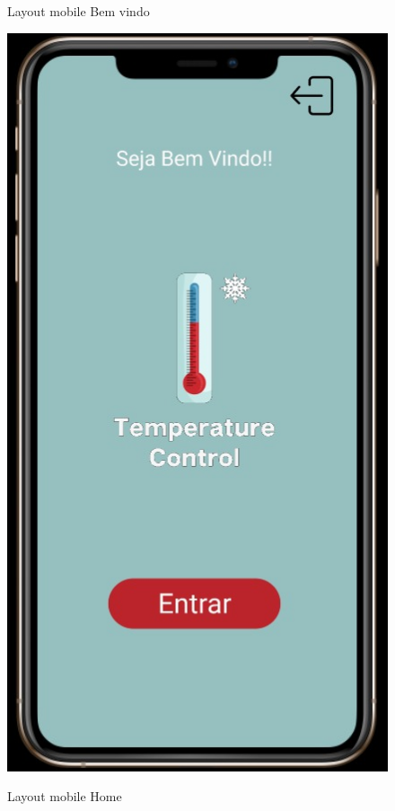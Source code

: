     \begin{figure}
        \centering
        \begin{minipage}{0.5\textwidth}
            \caption{Layout mobile Bem vindo}
            \centering
            \includegraphics[height=0.4\textheight]{img/mobile/bem_vindo.png}
            \label{fig:mobileBemVindo}
        \end{minipage}%
        \begin{minipage}{0.5\textwidth}
            \caption{Layout mobile Home}
            \centering

\end{minipage}
\end{figure}
